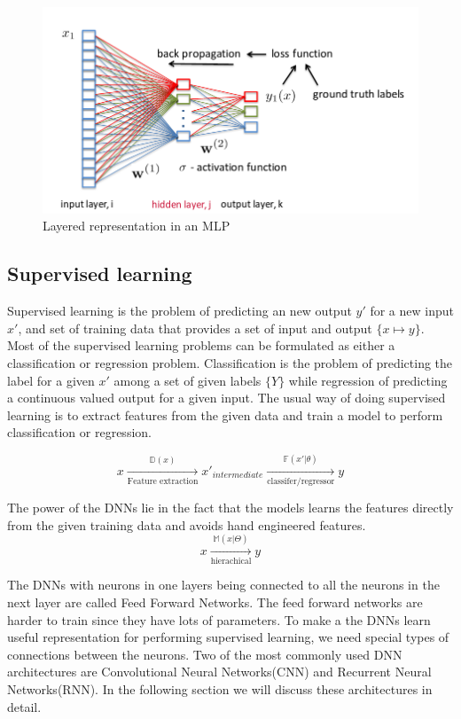 \documentclass[conference]{IEEEtran}
\newcommand*{\everymodeprime}{\ensuremath{\prime}}
\begin{document}
\begin{figure}
    \includegraphics[width=.99\linewidth]{img/mlp.png}  
    \caption{Layered representation in an MLP}
    \label{fig:mlp}
\end{figure}


\subsection{Supervised learning}
Supervised learning is the problem of predicting an new output $y\everymodeprime$  for a new input $x\everymodeprime$, and set of training data that provides a set of input and output $\{x \mapsto y\}$. Most of the supervised learning problems can be formulated as either a classification or regression problem. Classification is the problem of predicting the label for a given  $x\everymodeprime$ among a set of given labels $\{Y\}$ while regression of predicting a continuous  valued output for a given input. The usual way of doing supervised learning is to extract features from the given data and train a model to perform classification or regression. 



$$x \xrightarrow[\text{Feature extraction}]{ \mathbb{D}(x) } x\everymodeprime _{intermediate} \xrightarrow[\text{classifer/regressor}]{\mathbb{F}(x\everymodeprime | \theta)}   y$$

The power of the DNNs lie in the fact that the models learns the features directly from the given training data and avoids hand engineered features. 
$$ x \xrightarrow[ \text{hierachical}] { \mathbb{M}(x | \Theta) } y$$

The DNNs with neurons in one layers being connected to all the neurons in the next layer are called Feed Forward Networks. The feed forward networks are harder to train since they have lots of parameters. To make a the DNNs learn useful representation for performing supervised learning, we need special types of connections between the neurons. Two of the most commonly used DNN architectures are Convolutional Neural Networks(CNN) and Recurrent Neural Networks(RNN). In the following section we will discuss these architectures in detail.
\end{document}
